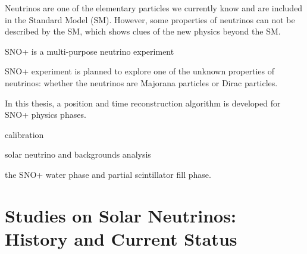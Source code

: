  
Neutrinos are one of the elementary particles we currently know and are included in the Standard Model (SM). However, some properties of neutrinos can not be described by the SM, which shows clues of the new physics beyond the SM.


SNO+ is a multi-purpose neutrino experiment


SNO+ experiment is planned to explore one of the unknown properties of neutrinos: whether the neutrinos are Majorana particles or Dirac particles.


In this thesis, a position and time reconstruction algorithm is developed for SNO+ physics phases.

calibration 

solar neutrino and backgrounds analysis

the SNO+ water phase and partial scintillator fill phase.

\section{Studies on Solar Neutrinos: History and Current Status}
